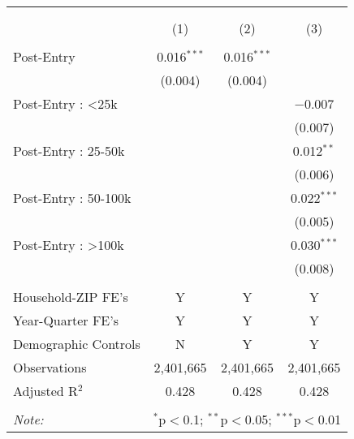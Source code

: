 
\begin{table}[!htbp] \centering 
  \caption{} 
  \label{} 
\begin{tabular}{@{\extracolsep{5pt}}lccc} 
\\[-1.8ex]\hline 
\hline \\[-1.8ex] 
\\[-1.8ex] & (1) & (2) & (3)\\ 
\hline \\[-1.8ex] 
 Post-Entry & 0.016$^{***}$ & 0.016$^{***}$ &  \\ 
  & (0.004) & (0.004) &  \\ 
  Post-Entry : <25k &  &  & $-$0.007 \\ 
  &  &  & (0.007) \\ 
  Post-Entry : 25-50k &  &  & 0.012$^{**}$ \\ 
  &  &  & (0.006) \\ 
  Post-Entry : 50-100k &  &  & 0.022$^{***}$ \\ 
  &  &  & (0.005) \\ 
  Post-Entry : >100k &  &  & 0.030$^{***}$ \\ 
  &  &  & (0.008) \\ 
 \hline \\[-1.8ex] 
Household-ZIP FE's & Y & Y & Y \\ 
Year-Quarter FE's & Y & Y & Y \\ 
Demographic Controls & N & Y & Y \\ 
Observations & 2,401,665 & 2,401,665 & 2,401,665 \\ 
Adjusted R$^{2}$ & 0.428 & 0.428 & 0.428 \\ 
\hline 
\hline \\[-1.8ex] 
\textit{Note:}  & \multicolumn{3}{l}{$^{*}$p$<$0.1; $^{**}$p$<$0.05; $^{***}$p$<$0.01} \\ 
\end{tabular} 
\end{table} 
